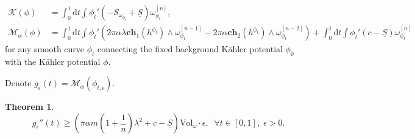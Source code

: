 \documentclass[10pt, letterpaper]{amsart}
\theoremstyle{plain}
\newtheorem{theorem}{Theorem}[section]
\theoremstyle{definition}
\numberwithin{equation}{section}
\begin{document}
\begin{align*}
    \mathcal{K}\left(\phi\right) 
   & = 
    \int_0^1 \mathrm{d}t \int \phi_t'\left( -S_{\omega_{\phi_t}}+\underline{S}\right)\omega_{\phi_t}^{[n]}, \\
    \mathcal{M}_\alpha\left(\phi\right)
    & = 
    \int_0^1 \mathrm{d}t \int \phi_t'\left(
    2\pi\alpha \lambda \mathbf{ch}_1\left(h^{\phi_t}\right) \wedge \omega_{\phi_t}^{[n-1]} 
    -
   2\pi\alpha \mathbf{ch}_2\left(h^{\phi_t}\right)\wedge \omega_{\phi_t}^{[n-2]}\right)
   + \int_0^1 \mathrm{d}t\int \phi_t'\left(c-\underline{S}\right)\omega_{\phi_t}^{[n]}
\end{align*}
for any smooth curve $\phi_t$ connecting the fixed background K\"ahler potential $\phi_0$ with the K\"ahler potential $\phi$.

Denote $g_\epsilon(t)= \mathcal{M}_\alpha \left(\phi_{t,\epsilon}\right)$.
	\begin{theorem}
		\[
		g_\epsilon''(t)
		\geq 
		\left(\pi\alpha m\left(1+\frac{1}{n}\right)\lambda^2+c-\underline{S}\right)\text{Vol}_\omega\cdot \epsilon, \;\; \forall t\in [0,1],\; \epsilon>0.
		\]
	\end{theorem}
	
\end{document}
